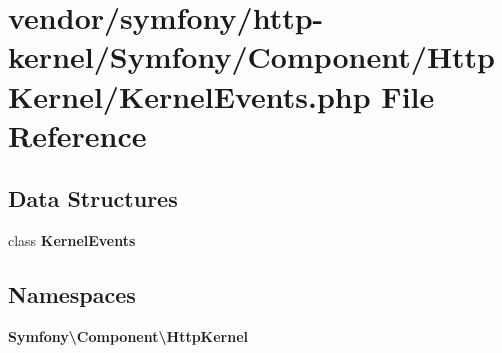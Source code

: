 \section{vendor/symfony/http-\/kernel/\+Symfony/\+Component/\+Http\+Kernel/\+Kernel\+Events.php File Reference}
\label{_kernel_events_8php}
\subsection*{Data Structures}
\begin{DoxyCompactItemize}
\item 
class {\bf Kernel\+Events}
\end{DoxyCompactItemize}
\subsection*{Namespaces}
\begin{DoxyCompactItemize}
\item 
 {\bf Symfony\textbackslash{}\+Component\textbackslash{}\+Http\+Kernel}
\end{DoxyCompactItemize}
